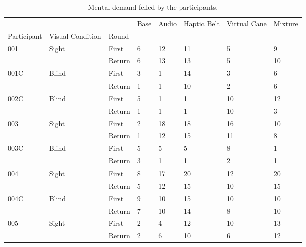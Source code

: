 
\begin{table}[!htb]
\centering
\caption{Mental demand felled by the participants.}
\label{tab:md_table}
\begin{tabular}{llllllll}
\toprule
    &       &        & Base & Audio & Haptic Belt & Virtual Cane & Mixture \\
Participant & Visual Condition & Round &      &       &             &              &         \\
\midrule
001 & Sight & First &    6 &    12 &          11 &            5 &       9 \\
    &       & Return &    6 &    13 &          13 &            5 &      10 \\
001C & Blind & First &    3 &     1 &          14 &            3 &       6 \\
    &       & Return &    1 &     1 &          10 &            2 &       6 \\
002C & Blind & First &    5 &     1 &           1 &           10 &      12 \\
    &       & Return &    1 &     1 &           1 &           10 &       3 \\
003 & Sight & First &    2 &    18 &          18 &           16 &      10 \\
    &       & Return &    1 &    12 &          15 &           11 &       8 \\
003C & Blind & First &    5 &     5 &           5 &            8 &       1 \\
    &       & Return &    3 &     1 &           1 &            2 &       1 \\
004 & Sight & First &    8 &    17 &          20 &           12 &      20 \\
    &       & Return &    5 &    12 &          15 &           10 &      15 \\
004C & Blind & First &    9 &    10 &          15 &           10 &      10 \\
    &       & Return &    7 &    10 &          14 &            8 &      10 \\
005 & Sight & First &    2 &     4 &          12 &           10 &      13 \\
    &       & Return &    2 &     6 &          10 &            6 &      12 \\
\bottomrule
\end{tabular}
\end{table}

